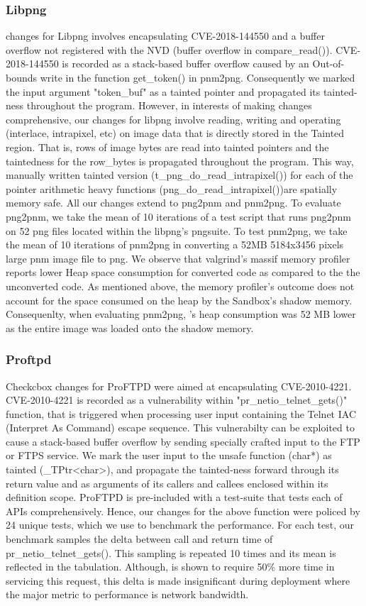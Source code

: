 \subsubsection{Libpng}
\systemname changes for Libpng involves encapsulating CVE-2018-144550 and a buffer overflow not registered with the NVD (buffer overflow in compare\_read()). CVE-2018-144550 is recorded as a stack-based buffer overflow caused by an Out-of-bounds write in the function get\_token() in pnm2png. Consequently we marked the input argument "token\_buf" as a tainted pointer and propagated its tainted-ness throughout the program. However, in interests of making changes comprehensive, our changes for libpng involve reading, writing and operating (interlace, intrapixel, etc) on image data that is directly stored in the Tainted region. That is, rows of image bytes are read into tainted pointers and the taintedness for the row\_bytes is propagated throughout the program. This way, manually written tainted version (t\_png\_do\_read\_intrapixel()) for each of the pointer arithmetic heavy functions (png\_do\_read\_intrapixel())are spatially memory safe. All our changes extend to png2pnm and pnm2png. To evaluate png2pnm, we take the mean of 10 iterations of a test script that runs png2pnm on 52 png files located within the libpng's pngsuite. To test pnm2png, we take the mean of 10 iterations of pnm2png in converting a 52MB 5184x3456 pixels large pnm image file to png. We observe that valgrind's massif memory profiler reports lower Heap space consumption for \systemname converted code as compared to the the unconverted code. As mentioned above, the memory profiler's outcome does not account for the space consumed on the heap by the Sandbox's shadow memory. Consequenlty, when evaluating pnm2png, \systemname's heap consumption was 52 MB lower as the entire image was loaded onto the shadow memory.  


\subsubsection{Proftpd}
Checkcbox changes for ProFTPD were aimed at encapsulating CVE-2010-4221. CVE-2010-4221 is recorded as a vulnerability within "pr\_netio\_telnet\_gets()" function, that is triggered when processing user input containing the Telnet IAC (Interpret As Command) escape sequence. This vulnerabilty can be exploited to cause a stack-based buffer overflow by sending specially crafted input to the FTP or FTPS service. We mark the user input to the unsafe function (char*) as tainted (\_TPtr<char>), and propagate the tainted-ness forward through its return value and as arguments of its callers and callees enclosed within its definition scope. ProFTPD is pre-included with a test-suite that tests each of APIs comprehensively. Hence, our changes for the above function were policed by 24 unique tests, which we use to benchmark the performance. For each test, our benchmark samples the delta between call and return time of pr\_netio\_telnet\_gets(). This sampling is repeated 10 times and its mean is reflected in the tabulation. Although, \systemname is shown to require 50\% more time in servicing this request, this delta is made insignificant during deployment where the major metric to performance is network bandwidth.

